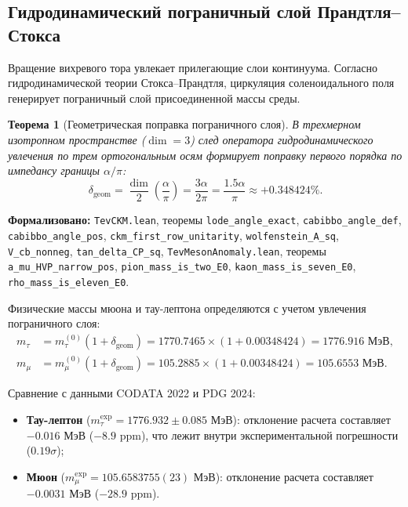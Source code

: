 \documentclass[11pt,a4paper]{article}
\newtheorem{theorem}{Теорема}
\theoremstyle{definition}
\theoremstyle{remark}
\begin{document}
\subsection{Гидродинамический пограничный слой Прандтля--Стокса}
	
Вращение вихревого тора увлекает прилегающие слои континуума. Согласно гидродинамической теории Стокса--Прандтля, циркуляция соленоидального поля генерирует пограничный слой присоединенной массы среды.
	
\begin{theorem}[Геометрическая поправка пограничного слоя]
\label{thm:stokes_boundary_layer}
В трехмерном изотропном пространстве ($\dim = 3$) след оператора гидродинамического увлечения по трем ортогональным осям формирует поправку первого порядка по импедансу границы $\alpha/\pi$:
\begin{equation}
	\delta_{\mathrm{geom}} = \frac{\dim}{2} \left(\frac{\alpha}{\pi}\right) = \frac{3\alpha}{2\pi} = \frac{1.5\alpha}{\pi} \approx +0.348424\%.
	\label{eq:stokes_boundary_layer_exact}
\end{equation}
\end{theorem}

\noindent\small\textbf{Формализовано:} \texttt{TevCKM.lean}, теоремы \texttt{lode_angle_exact}, \texttt{cabibbo_angle_def}, \texttt{cabibbo_angle_pos}, \texttt{ckm_first_row_unitarity}, \texttt{wolfenstein_A_sq}, \texttt{V_cb_nonneg}, \texttt{tan_delta_CP_sq}, \texttt{TevMesonAnomaly.lean}, теоремы \texttt{a_mu_HVP_narrow_pos}, \texttt{pion_mass_is_two_E0}, \texttt{kaon_mass_is_seven_E0}, \texttt{rho_mass_is_eleven_E0}.

Физические массы мюона и тау-лептона определяются с учетом увлечения пограничного слоя:
\begin{align}
m_\tau &= m_\tau^{(0)} (1 + \delta_{\mathrm{geom}}) = 1770.7465 \times (1 + 0.00348424) = 1776.916\text{ МэВ}, \label{eq:tau_dressed_calc} \\
m_\mu  &= m_\mu^{(0)} (1 + \delta_{\mathrm{geom}}) = 105.2885 \times (1 + 0.00348424) = 105.6553\text{ МэВ}. \label{eq:muon_dressed_calc}
\end{align}
	
Сравнение с данными CODATA 2022 и PDG 2024:
\begin{itemize}
\item \textbf{Тау-лептон} ($m_\tau^{\mathrm{exp}} = 1776.932 \pm 0.085\text{ МэВ}$): отклонение расчета составляет $-0.016\text{ МэВ}$ ($-8.9\text{ ppm}$), что лежит внутри экспериментальной погрешности ($0.19\sigma$);
\item \textbf{Мюон} ($m_\mu^{\mathrm{exp}} = 105.6583755(23)\text{ МэВ}$): отклонение расчета составляет $-0.0031\text{ МэВ}$ ($-28.9\text{ ppm}$).
\end{itemize}
\end{document}
